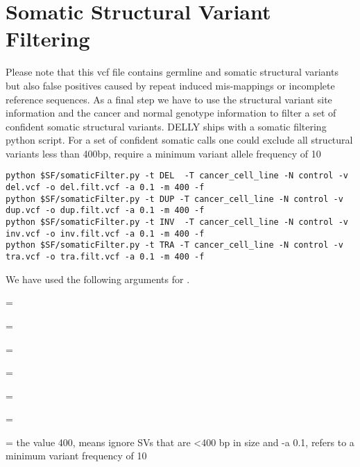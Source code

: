 \section{Somatic Structural Variant Filtering}

\begin{information}
Please note that this vcf file contains germline and somatic structural variants but also false positives caused by repeat induced mis-mappings or incomplete reference sequences. As a final step we have to use the structural variant site information and the cancer and normal genotype information to filter a set of confident somatic structural variants. DELLY ships with a somatic filtering python script. For a set of confident somatic calls one could exclude all structural variants less than 400bp, require a minimum variant allele frequency of 10%

\end{information}
\begin{steps}
\begin{lstlisting}
python $SF/somaticFilter.py -t DEL  -T cancer_cell_line -N control -v del.vcf -o del.filt.vcf -a 0.1 -m 400 -f
python $SF/somaticFilter.py -t DUP -T cancer_cell_line -N control -v dup.vcf -o dup.filt.vcf -a 0.1 -m 400 -f
python $SF/somaticFilter.py -t INV  -T cancer_cell_line -N control -v inv.vcf -o inv.filt.vcf -a 0.1 -m 400 -f
python $SF/somaticFilter.py -t TRA -T cancer_cell_line -N control -v tra.vcf -o tra.filt.vcf -a 0.1 -m 400 -f
\end{lstlisting}
\end{steps}

We have used the following arguments for .
\begin{description}[style=multiline,labelindent=0cm,align=right,leftmargin=\descriptionlabelspace,rightmargin=1.5cm,font=\ttfamily]
  \item[-t] = 
  \item[-T] = 
  \item[-N] = 
  \item[-v] = 
  \item[-o] = 
  \item[-a] = 
  \item[-m] = the value 400, means ignore SVs that are <400 bp in size and -a 0.1, refers to a minimum variant frequency of 10%
\end{description}


